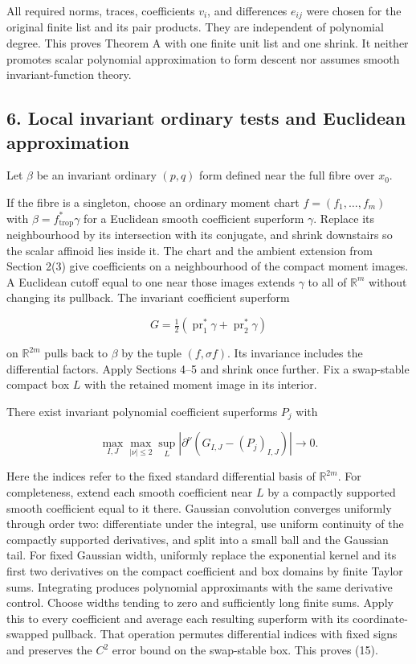 \documentclass[
  11pt,
]{article}
\begin{document}
All required norms, traces, coefficients \(v_i\), and differences
\(e_{ij}\) were chosen for the original finite list and its pair
products. They are independent of polynomial degree. This proves Theorem
A with one finite unit list and one shrink. It neither promotes scalar
polynomial approximation to form descent nor assumes smooth
invariant-function theory.

\subsection{6. Local invariant ordinary tests and Euclidean
approximation}\label{local-invariant-ordinary-tests-and-euclidean-approximation}

Let \(\beta\) be an invariant ordinary \((p,q)\) form defined near the
full fibre over \(x_0\).

If the fibre is a singleton, choose an ordinary moment chart
\(f=(f_1,\ldots,f_m)\) with \(\beta=f_{\mathrm{trop}}^*\gamma\) for a
Euclidean smooth coefficient superform \(\gamma\). Replace its
neighbourhood by its intersection with its conjugate, and shrink
downstairs so the scalar affinoid lies inside it. The chart and the
ambient extension from Section 2(3) give coefficients on a neighbourhood
of the compact moment images. A Euclidean cutoff equal to one near those
images extends \(\gamma\) to all of \(\mathbb R^m\) without changing its
pullback. The invariant coefficient superform

\[G=\tfrac12(\operatorname{pr}_1^*\gamma+\operatorname{pr}_2^*\gamma) \tag{14}\]

on \(\mathbb R^{2m}\) pulls back to \(\beta\) by the tuple
\((f,\sigma f)\). Its invariance includes the differential factors.
Apply Sections 4--5 and shrink once further. Fix a swap-stable compact
box \(L\) with the retained moment image in its interior.

There exist invariant polynomial coefficient superforms \(P_j\) with

\[\max_{I,J}\max_{|\nu|\leq2}\sup_L|\partial^\nu(G_{I,J}-(P_j)_{I,J})|\longrightarrow0. \tag{15}\]

Here the indices refer to the fixed standard differential basis of
\(\mathbb R^{2m}\). For completeness, extend each smooth coefficient
near \(L\) by a compactly supported smooth coefficient equal to it
there. Gaussian convolution converges uniformly through order two:
differentiate under the integral, use uniform continuity of the
compactly supported derivatives, and split into a small ball and the
Gaussian tail. For fixed Gaussian width, uniformly replace the
exponential kernel and its first two derivatives on the compact
coefficient and box domains by finite Taylor sums. Integrating produces
polynomial approximants with the same derivative control. Choose widths
tending to zero and sufficiently long finite sums. Apply this to every
coefficient and average each resulting superform with its
coordinate-swapped pullback. That operation permutes differential
indices with fixed signs and preserves the \(C^2\) error bound on the
swap-stable box. This proves (15).
\end{document}

